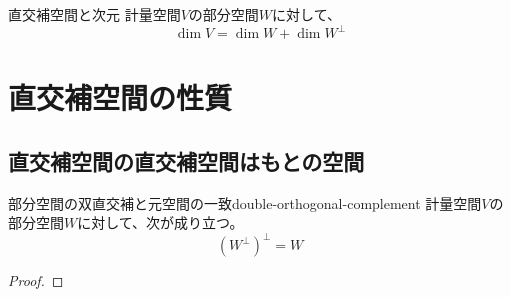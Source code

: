 \documentclass[../../../topic_linear-algebra]{subfiles}
\begin{document}
\begin{theorem}{直交補空間と次元}
  計量空間$V$の部分空間$W$に対して、
  \begin{equation*}
    \dim V = \dim W + \dim W^\perp
  \end{equation*}
\end{theorem}

\sectionline
\section{直交補空間の性質}

\subsection{直交補空間の直交補空間はもとの空間}

\begin{theorem}{部分空間の双直交補と元空間の一致}{double-orthogonal-complement}
  計量空間$V$の部分空間$W$に対して、次が成り立つ。
  \begin{equation*}
    (W^\perp)^\perp = W
  \end{equation*}
\end{theorem}

\begin{proof}
  \todo{}
\end{proof}
\end{document}
